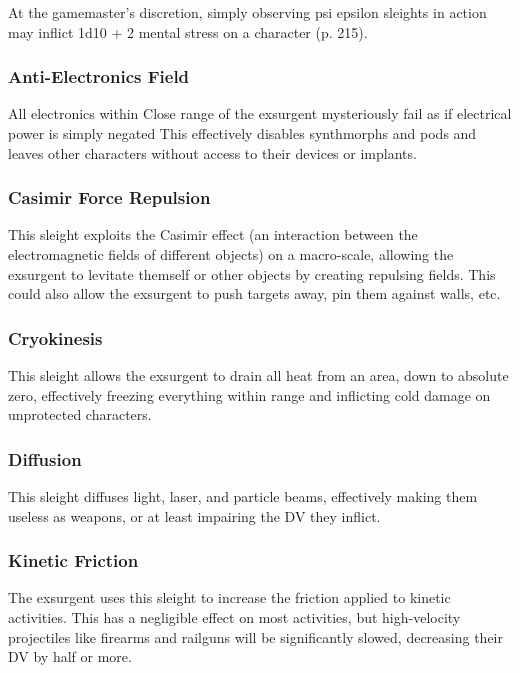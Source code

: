 At the gamemaster's discretion, simply observing psi 
epsilon sleights in action may inflict 1d10 + 2 mental 
stress on a character (p. 215).

\subsubsection{Anti-Electronics Field}

All electronics within Close range of the exsurgent 
mysteriously fail as if electrical power is simply negated
This effectively disables synthmorphs and pods
and leaves other characters without access to their 
devices or implants.

\subsubsection{Casimir Force Repulsion}

This sleight exploits the Casimir effect (an interaction 
between the electromagnetic fields of different objects) 
on a macro-scale, allowing the exsurgent to levitate 
themself or other objects by creating repulsing fields. 
This could also allow the exsurgent to push targets 
away, pin them against walls, etc. 

\subsubsection{Cryokinesis}

This sleight allows the exsurgent to drain all heat from 
an area, down to absolute zero, effectively freezing 
everything within range and inflicting cold damage on 
unprotected characters.

\subsubsection{Diffusion}

This sleight diffuses light, laser, and particle beams, effectively
making them useless as weapons, or at least
impairing the DV they inflict.

\subsubsection{Kinetic Friction}

The exsurgent uses this sleight to increase the friction
applied to kinetic activities. This has a negligible
effect on most activities, but high-velocity projectiles 
like firearms and railguns will be significantly slowed, 
decreasing their DV by half or more.

